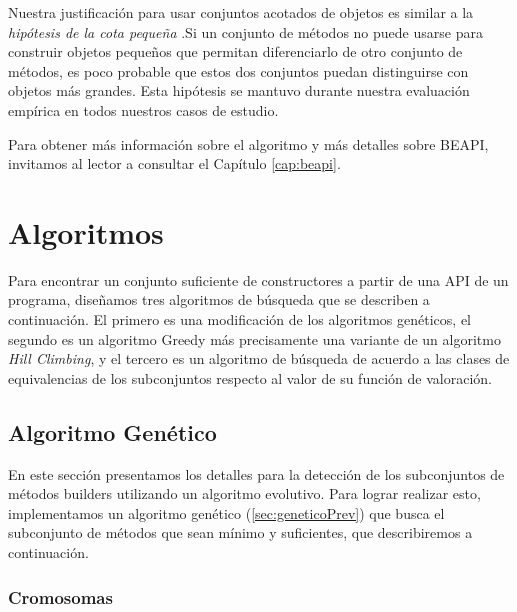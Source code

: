 Nuestra justificación para usar conjuntos acotados de objetos es similar a la \emph{hipótesis de la cota pequeña} \cite{Andoni:2003}.Si un conjunto de métodos no puede usarse para construir objetos pequeños que permitan diferenciarlo de otro conjunto de métodos, es poco probable que estos dos conjuntos puedan distinguirse con objetos más grandes. Esta hipótesis se mantuvo durante nuestra evaluación empírica en todos nuestros casos de estudio.

Para obtener más información sobre el algoritmo y más detalles sobre BEAPI, invitamos al lector a consultar el Capítulo \ref{cap:beapi}.




\section{Algoritmos}
\label{sec:algorithms}
Para encontrar un conjunto suficiente de constructores a partir de una API de un programa, diseñamos tres algoritmos de búsqueda que se describen a continuación. El primero es una modificación de los algoritmos genéticos, el segundo es un algoritmo Greedy más precisamente una variante de un algoritmo \emph{Hill Climbing}, y el tercero es un algoritmo de búsqueda de acuerdo a las clases de equivalencias de los subconjuntos respecto al valor de su función de valoración.

\subsection{Algoritmo Genético}
\label{alg:approachGA}
En este sección presentamos los detalles para la detección de los subconjuntos de métodos builders utilizando un algoritmo evolutivo. Para lograr realizar esto, implementamos un algoritmo genético (\ref{sec:geneticoPrev}) que busca el subconjunto de métodos que sean mínimo y suficientes, que describiremos a continuación.






\subsubsection{Cromosomas}
\label{ge:cromosomas}

